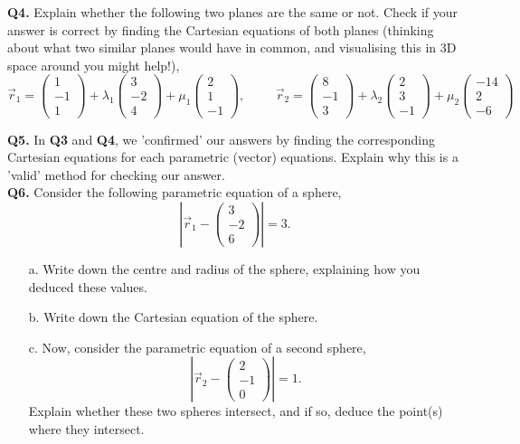 \documentclass{article}
\begin{document}
\textbf{Q4.} Explain whether the following two planes are the same or not. Check if your answer is correct by finding the Cartesian equations of both planes (thinking about what two similar planes would have in common, and visualising this in 3D space around you might help!),
$$
\vec{r}_1 = 
\begin{pmatrix}
    1 \\ -1 \\ 1
\end{pmatrix}
+ \lambda_1
\begin{pmatrix}
    3 \\ -2 \\ 4
\end{pmatrix}
+ \mu_1
\begin{pmatrix}
    2 \\ 1 \\ -1
\end{pmatrix}, \hspace{1cm}
\vec{r}_2 = 
\begin{pmatrix}
    8 \\ -1 \\ 3
\end{pmatrix}
+ \lambda_2
\begin{pmatrix}
    2 \\ 3 \\ -1
\end{pmatrix}
+ \mu_2
\begin{pmatrix}
    -14 \\ 2 \\ -6
\end{pmatrix}
$$

\textbf{Q5.} In \textbf{Q3} and \textbf{Q4}, we 'confirmed' our answers by finding the corresponding Cartesian equations for each parametric (vector) equations. Explain why this is a 'valid' method for checking our answer. \\

\textbf{Q6.} Consider the following parametric equation of a sphere,
$$
\left|
\vec{r}_1 - 
\begin{pmatrix}
    3 \\ -2 \\ 6
\end{pmatrix}
\right|
= 3.
$$
\begin{enumerate}
    \item[a.] Write down the centre and radius of the sphere, explaining how you deduced these values.
    \item[b.] Write down the Cartesian equation of the sphere.
    \item[c.] Now, consider the parametric equation of a second sphere,
$$
\left|
\vec{r}_2 - 
\begin{pmatrix}
    2 \\ -1 \\ 0
\end{pmatrix}
\right|
= 1.
$$
            Explain whether these two spheres intersect, and if so, deduce the point(s) where they intersect.
\end{enumerate}
\end{document}
